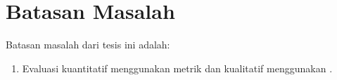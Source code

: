 \section{Batasan Masalah}

Batasan masalah dari tesis ini adalah:
\begin{enumerate}
    \item Evaluasi kuantitatif menggunakan metrik \SMATCH{}  dan kualitatif menggunakan \transdiver{} .
\end{enumerate}
